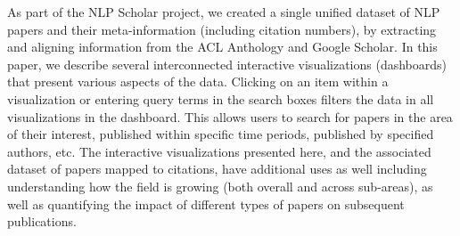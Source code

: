 As part of the NLP Scholar project, we created a single unified dataset of NLP papers and their meta-information (including citation numbers), by extracting and aligning information from the ACL Anthology and Google Scholar. In this paper, we describe several interconnected interactive visualizations (dashboards) that present various aspects of the data. Clicking on an item within a visualization or entering query terms in the search boxes filters the data in all visualizations in the dashboard. This allows users to search for papers in the area of their interest, published within specific time periods, published by specified authors, etc. The interactive visualizations presented here, and the associated dataset of papers mapped to citations, have additional uses as well including  understanding how the field is growing (both overall and across sub-areas), as well as quantifying the impact of different types of papers on subsequent publications.
